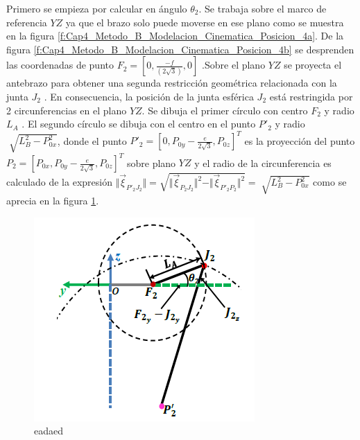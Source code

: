      Primero se empieza por calcular en ángulo $\theta_2$. Se trabaja sobre el marco de referencia $YZ$ ya que el brazo   solo puede moverse en ese plano como se muestra en la figura \ref{f:Cap4_Metodo_B_Modelacion_Cinematica_Posicion_4a}. De la figura \ref{f:Cap4_Metodo_B_Modelacion_Cinematica_Posicion_4b} se desprenden las coordenadas de punto $F_2=\left[0,\frac{-f}{(2\sqrt{3})},0\right]$ .Sobre el plano $ YZ $ se proyecta el antebrazo para obtener una segunda restricción geométrica relacionada con la junta  \( J_{2} \) . En consecuencia, la posición de la junta esférica  \( J_{2} \)  está restringida por 2 circunferencias en el plano $YZ$. Se dibuja el primer círculo con centro  \( F_{2} \)  y radio  \( L_{A} \) . El segundo círculo se dibuja con el centro en el punto  \( P'_{2} \)  y radio  \( \sqrt[]{L_{B}^{2}-P_{0x}^{2}} \), donde el punto $P'_{2}=\left[0,P_{0y}-\frac{e}{2\sqrt{3}},P_{0z}\right]^T$ es la proyección del punto $P_{2}=\left[P_{0x},P_{0y}-\frac{e}{2\sqrt{3}},P_{0z}\right]^T$ sobre plano $YZ$ y el radio de la circunferencia es calculado de la expresión  $\Vert \overrightarrow{\xi}_{P'_2J_2} \Vert = \sqrt{\Vert \overrightarrow{\xi}_{P_2J_2}\Vert^2-\Vert \overrightarrow{\xi}_{P'_2P_2}\Vert^2 }=\sqrt[]{L_{B}^{2}-P_{0x}^{2}}$       como se aprecia en la figura \ref{f:f:Cap4_Metodo_B_Modelacion_Cinematica_Posicion_44}.
      
     \newpage

            \begin{figure}[htb]
                 \centering
               \includegraphics[width=0.7\linewidth]{Main/Chapter4/Images4/Metodo_B_Modelacion_Cinematica_Posicion_4b.png}
               \caption{eadaed}
               \label{f:f:Cap4_Metodo_B_Modelacion_Cinematica_Posicion_44}
            \end{figure}
            
